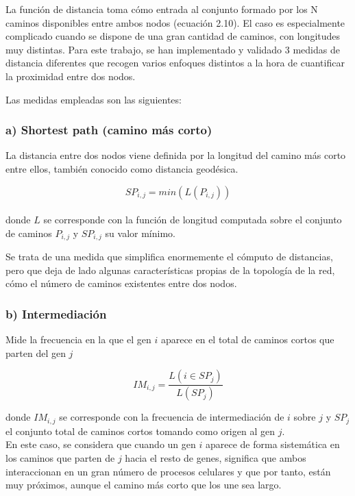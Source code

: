 \medskip
La función de distancia toma cómo entrada al conjunto formado por los N caminos disponibles entre ambos nodos (ecuación 2.10). El caso es especialmente complicado cuando se dispone de una gran cantidad de caminos, con longitudes muy distintas. Para este trabajo, se han implementado y validado 3 medidas de distancia diferentes que recogen varios enfoques distintos a la hora de cuantificar la proximidad entre dos nodos.

\medskip
Las medidas empleadas son las siguientes:

\subsubsection{a) Shortest path (camino más corto)}

La distancia entre dos nodos viene definida por la longitud del camino más corto entre ellos, también conocido como distancia geodésica. 

\begin{equation}
SP_{i,j} = min(L(P_{i,j}))
\end{equation}
\\

donde $L$ se corresponde con la función de longitud computada sobre el conjunto de caminos $P_{i,j}$ y $SP_{i,j}$ su valor mínimo.

\medskip
Se trata de una medida que simplifica enormemente el cómputo de distancias, pero que deja de lado algunas características propias de la topología de la red, cómo el número de caminos existentes entre dos nodos.

\subsubsection{b) Intermediación}

Mide la frecuencia en la que el gen $i$ aparece en el total de caminos cortos que parten del gen $j$

\begin{equation}
IM_{i,j} = \frac{L(i \in SP_j)}{L(SP_j)} 
\end{equation}

donde $IM_{i,j}$ se corresponde con la frecuencia de intermediación de $i$ sobre $j$ y $SP_j$ el conjunto total de caminos cortos tomando como origen al gen $j$.
\\

En este caso, se considera que cuando un gen $i$ aparece de forma sistemática en los caminos que parten de $j$ hacia el resto de genes, significa que ambos interaccionan en un gran número de procesos celulares y que por tanto, están muy próximos, aunque el camino más corto que los une sea largo.

